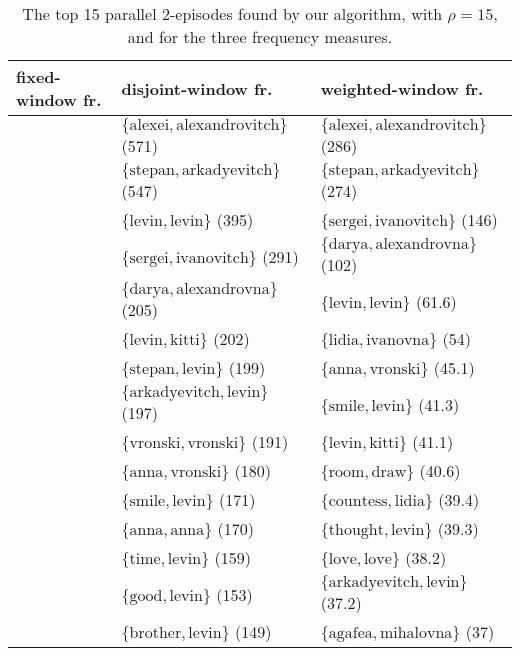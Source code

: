 \begin{table}


\begin{tabulary}{\textwidth}{L|L|L}

fixed-window fr. & disjoint-window fr. & weighted-window fr. \\
\hline
& $ \{ \text{alexei}, \text{alexandrovitch} \} $ (571) & $ \{ \text{alexei}, \text{alexandrovitch} \} $ (286) \\
& $ \{ \text{stepan}, \text{arkadyevitch} \} $ (547) & $ \{ \text{stepan}, \text{arkadyevitch} \} $ (274) \\
& $ \{ \text{levin}, \text{levin} \} $ (395) & $ \{ \text{sergei}, \text{ivanovitch} \} $ (146) \\
& $ \{ \text{sergei}, \text{ivanovitch} \} $ (291) & $ \{ \text{darya}, \text{alexandrovna} \} $ (102) \\
& $ \{ \text{darya}, \text{alexandrovna} \} $ (205) & $ \{ \text{levin}, \text{levin} \} $ (61.6) \\
& $ \{ \text{levin}, \text{kitti} \} $ (202) & $ \{ \text{lidia}, \text{ivanovna} \} $ (54) \\
& $ \{ \text{stepan}, \text{levin} \} $ (199) & $ \{ \text{anna}, \text{vronski} \} $ (45.1) \\
& $ \{ \text{arkadyevitch}, \text{levin} \} $ (197) & $ \{ \text{smile}, \text{levin} \} $ (41.3) \\
& $ \{ \text{vronski}, \text{vronski} \} $ (191) & $ \{ \text{levin}, \text{kitti} \} $ (41.1) \\
& $ \{ \text{anna}, \text{vronski} \} $ (180) & $ \{ \text{room}, \text{draw} \} $ (40.6) \\
& $ \{ \text{smile}, \text{levin} \} $ (171) & $ \{ \text{countess}, \text{lidia} \} $ (39.4) \\
& $ \{ \text{anna}, \text{anna} \} $ (170) & $ \{ \text{thought}, \text{levin} \} $ (39.3) \\
& $ \{ \text{time}, \text{levin} \} $ (159) & $ \{ \text{love}, \text{love} \} $ (38.2) \\
& $ \{ \text{good}, \text{levin} \} $ (153) & $ \{ \text{arkadyevitch}, \text{levin} \} $ (37.2) \\
& $ \{ \text{brother}, \text{levin} \} $ (149) & $ \{ \text{agafea}, \text{mihalovna} \} $ (37) \\

\end{tabulary}

\caption{The top 15 parallel 2-episodes found by our algorithm, with $ \rho = 15 $, and for the three frequency measures.}
\label{table:fmw-tolstoy-top-15-2-episodes}
\end{table}

